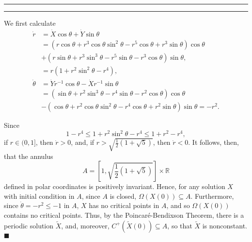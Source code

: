 \documentclass[11pt]{article}
\newcounter{questionCounter}
\newcounter{partCounter}[questionCounter]
\newenvironment{question}[2][\arabic{questionCounter}]{%
    \setcounter{partCounter}{0}%
    \vspace{.25in} \hrule \vspace{0.5em}%
        \noindent{\bf #2}%
    \vspace{0.8em} \hrule \vspace{.10in}%
    \addtocounter{questionCounter}{1}%
}{}
\renewcommand{\qed}{\quad $\blacksquare$}
\newcommand{\inv}{^{-1}}
\newcommand{\R}{\mathbb{R}} %
\begin{document}
\begin{question}{Problem 4}
We first calculate
\begin{align*}
\dot r
    & = \dot X \cos \theta + \dot Y \sin \theta \\
    & = \left( r\cos\theta + r^3\cos\theta\sin^2\theta
            - r^5\cos\theta + r^3\sin\theta \right) \cos \theta     \\
    & + \left( r\sin\theta + r^3\sin^3\theta
            - r^5\sin\theta - r^3\cos\theta \right) \sin \theta,    \\
    & = r\left( 1 + r^2\sin^2\theta - r^4 \right),  \\
\dot \theta
    & = \dot Y r\inv \cos \theta - \dot X r\inv \sin \theta \\
    & = \left( \sin\theta + r^2\sin^3\theta
            - r^4\sin\theta - r^2\cos\theta \right) \cos \theta   \\
    & - \left( \cos\theta + r^2\cos\theta\sin^2\theta
            - r^4\cos\theta + r^2\sin\theta \right) \sin \theta
      = -r^2.
\end{align*}

Since
\[1 - r^4 \leq 1 + r^2\sin^2\theta - r^4 \leq 1 + r^2 - r^4,\]
if $r \in (0,1]$, then $\dot r > 0$, and, if
$r > \sqrt{\frac12 (1 + \sqrt5)}$, then $\dot r < 0$. It follows, then, that
the annulus
\[A = \left[ 1, \sqrt{\frac12 (1 + \sqrt5)} \right] \times \R\]
defined in polar coordinates is positively invariant. Hence, for any solution
$X$ with initial condition in $A$, since $A$ is closed,
$\Omega(X(0)) \subseteq A$. Furthermore, since $\dot \theta = -r^2 \leq -1$ in
$A$, $X$ has no critical points in $A$, and so $\Omega(X(0))$ contains no
critical points. Thus, by the Poincar\'e-Bendixson Theorem, there is a periodic
solution $\widetilde{X}$, and, moreover, $C^+(\widetilde{X}(0)) \subseteq A$,
so that $\widetilde{X}$ is nonconstant. \qed
\end{question}
\end{document}
